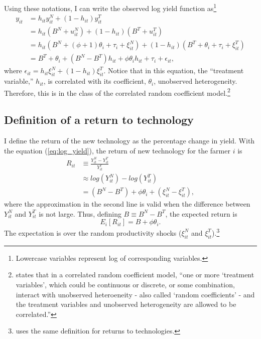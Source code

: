 \documentclass[11pt,letterpaper]{article}
\begin{document}
Using these notations, I can write the observed log yield function as\footnote{Lowercase variables represent log of corresponding variables.}
\begin{align}\label{eq:log_yield}
  y_{it} &= h_{it} y_{it}^N + (1 - h_{it}) y_{it}^T \nonumber \\
  &= h_{it} (B^N + u_{it}^N) + (1 - h_{it}) (B^T + u_{it}^T) \nonumber \\
  &= h_{it} (B^N + (\phi + 1) \theta_i + \tau_i + \xi_{it}^N) + (1 - h_{it}) (B^T + \theta_i + \tau_i + \xi_{it}^T) \nonumber \\
  &= B^T + \theta_i + (B^N - B^T) h_{it} + \phi \theta_i h_{it} + \tau_i + \epsilon_{it},
\end{align}
where $\epsilon_{it} = h_{it} \xi_{it}^N + (1 - h_{it}) \xi_{it}^T$.
Notice that in this equation, the ``treatment variable,'' $h_{it}$, is correlated with its coefficient, $\theta_i$, unobserved heterogeneity.
Therefore, this is in the class of the correlated random coefficient model.\footnote{
  \citet{Wooldridge03} states that in a correlated random coefficient model, ``one or more `treatment variables', which could be continuous or discrete, or some combination, interact with unobserved heteroeneity - also called `random coefficients' - and the treatment variables and unobserved heterogeneity are allowed to be correlated.''
}

\subsection{Definition of a return to technology}

I define the return of the new technology as the percentage change in yield.
With the equation (\ref{eq:log_yield}), the return of new technology for the farmer $i$ is
\begin{align*}
  R_{it} &\equiv \frac{Y_{it}^{N} - Y_{it}^{T}}{Y_{it}^{T}} \\
         &\approx log(Y_{it}^{N}) - log(Y_{it}^{T}) \\
         &= (B^N - B^T) + \phi \theta_i + (\xi_{it}^N - \xi_{it}^T),
\end{align*}
where the approximation in the second line is valid when the difference between $Y_{it}^N$ and $Y_{it}^T$ is not large.
Thus, defining $B \equiv B^N - B^T$, the expected return is 
\begin{equation*}
  E_i[R_{it}] = B + \phi \theta_i.
\end{equation*}
The expectation is over the random productivity shocks ($\xi_{it}^N$ and $\xi_{it}^T$).\footnote{
  \citet{Suri11} uses the same definition for returns to technologies.
}
\end{document}
